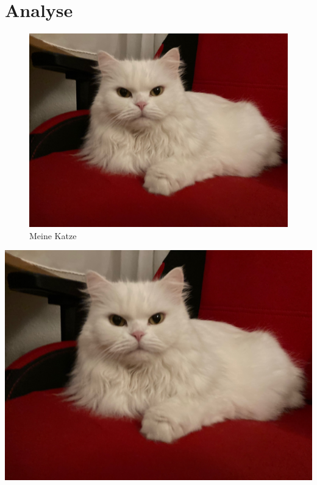 \chapter{Analyse}\label{cha:Analyse}

\blindtext[5]

\begin{figure}
\includegraphics[width=\textwidth]{Bilder/Katze}
\caption{Meine Katze}\label{fig:Katze}
\end{figure}

\blindtext[5]

\includegraphics[width=\textwidth]{Bilder/Katze}
\label{fig:Katze2}

\blindtext[12]

\blindtext[12]

\blindtext[12]

\blindtext[12]